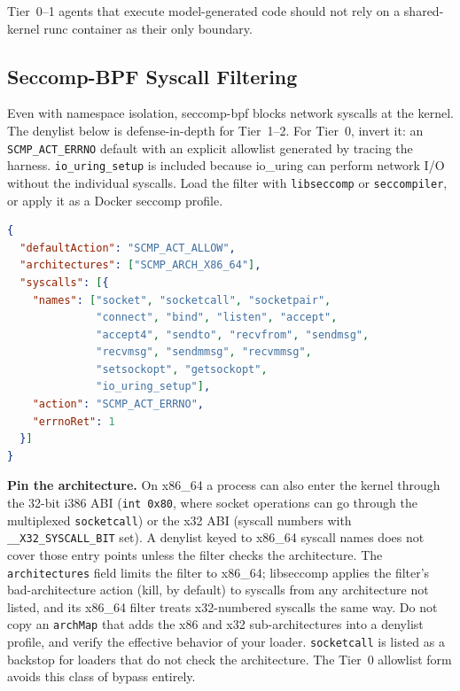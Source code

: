 \documentclass[11pt,letterpaper]{article}
\begin{document}
\begin{keybox}
Tier~0--1 agents that execute model-generated code should not rely on a shared-kernel runc container as their only boundary.
\end{keybox}

\subsection{Seccomp-BPF Syscall Filtering}

Even with namespace isolation, seccomp-bpf blocks network syscalls at the kernel. The denylist below is defense-in-depth for Tier~1--2. For Tier~0, invert it: an \texttt{SCMP\_ACT\_ERRNO} default with an explicit allowlist generated by tracing the harness. \texttt{io\_uring\_setup} is included because io\_uring can perform network I/O without the individual syscalls. Load the filter with \texttt{libseccomp} or \texttt{seccompiler}, or apply it as a Docker seccomp profile.

\begin{lstlisting}[language=json]
{
  "defaultAction": "SCMP_ACT_ALLOW",
  "architectures": ["SCMP_ARCH_X86_64"],
  "syscalls": [{
    "names": ["socket", "socketcall", "socketpair",
              "connect", "bind", "listen", "accept",
              "accept4", "sendto", "recvfrom", "sendmsg",
              "recvmsg", "sendmmsg", "recvmmsg",
              "setsockopt", "getsockopt",
              "io_uring_setup"],
    "action": "SCMP_ACT_ERRNO",
    "errnoRet": 1
  }]
}
\end{lstlisting}

\textbf{Pin the architecture.} On x86\_64 a process can also enter the kernel through the 32-bit i386 ABI (\texttt{int 0x80}, where socket operations can go through the multiplexed \texttt{socketcall}) or the x32 ABI (syscall numbers with \texttt{\_\_X32\_SYSCALL\_BIT} set). A denylist keyed to x86\_64 syscall names does not cover those entry points unless the filter checks the architecture. The \texttt{architectures} field limits the filter to x86\_64; libseccomp applies the filter's bad-architecture action (kill, by default) to syscalls from any architecture not listed, and its x86\_64 filter treats x32-numbered syscalls the same way. Do not copy an \texttt{archMap} that adds the x86 and x32 sub-architectures into a denylist profile, and verify the effective behavior of your loader. \texttt{socketcall} is listed as a backstop for loaders that do not check the architecture. The Tier~0 allowlist form avoids this class of bypass entirely.
\end{document}
